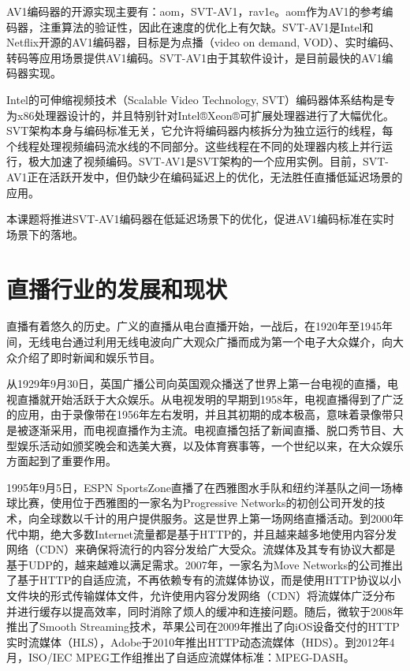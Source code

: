 AV1编码器的开源实现主要有：aom\cite{AV1SourceCode2020}，SVT-AV1\cite{ScalableVideoTechnology2020}，rav1e\cite{Rav1eGitRepository2020}。aom作为AV1的参考编码器，注重算法的验证性，因此在速度的优化上有欠缺。SVT-AV1是Intel和Netflix开源的AV1编码器，目标是为点播（video on demand, VOD）、实时编码、转码等应用场景提供AV1编码。SVT-AV1由于其软件设计，是目前最快的AV1编码器实现。

Intel的可伸缩视频技术（Scalable Video Technology, SVT）\cite{awsScalableVideoTechnology2019}编码器体系结构是专为x86处理器设计的，并且特别针对Intel®Xeon®可扩展处理器进行了大幅优化。SVT架构本身与编码标准无关，它允许将编码器内核拆分为独立运行的线程，每个线程处理视频编码流水线的不同部分。这些线程在不同的处理器内核上并行运行，极大加速了视频编码。SVT-AV1是SVT架构的一个应用实例。目前，SVT-AV1正在活跃开发中，但仍缺少在编码延迟上的优化，无法胜任直播低延迟场景的应用。

本课题将推进SVT-AV1编码器在低延迟场景下的优化，促进AV1编码标准在实时场景下的落地。

\section{直播行业的发展和现状}

直播有着悠久的历史。广义的直播从电台直播开始，一战后，在1920年至1945年间，无线电台通过利用无线电波向广大观众广播而成为第一个电子大众媒介，向大众介绍了即时新闻和娱乐节目。

从1929年9月30日，英国广播公司向英国观众播送了世界上第一台电视的直播，电视直播就开始活跃于大众娱乐。从电视发明的早期到1958年，电视直播得到了广泛的应用，由于录像带在1956年左右发明，并且其初期的成本极高，意味着录像带只是被逐渐采用，而电视直播作为主流。电视直播包括了新闻直播、脱口秀节目、大型娱乐活动如颁奖晚会和选美大赛，以及体育赛事等，一个世纪以来，在大众娱乐方面起到了重要作用。

1995年9月5日，ESPN SportsZone直播了在西雅图水手队和纽约洋基队之间一场棒球比赛，使用位于西雅图的一家名为Progressive Networks的初创公司开发的技术，向全球数以千计的用户提供服务。这是世界上第一场网络直播活动。到2000年代中期，绝大多数Internet流量都是基于HTTP的，并且越来越多地使用内容分发网络（CDN）来确保将流行的内容分发给广大受众。流媒体及其专有协议大都是基于UDP的，越来越难以满足需求。2007年，一家名为Move Networks的公司推出了基于HTTP的自适应流，不再依赖专有的流媒体协议，而是使用HTTP协议以小文件块的形式传输媒体文件，允许使用内容分发网络（CDN）将流媒体广泛分布并进行缓存以提高效率，同时消除了烦人的缓冲和连接问题。随后，微软于2008年推出了Smooth Streaming技术，苹果公司在2009年推出了向iOS设备交付的HTTP实时流媒体（HLS），Adobe于2010年推出HTTP动态流媒体（HDS）。到2012年4月，ISO/IEC MPEG工作组推出了自适应流媒体标准：MPEG-DASH。

